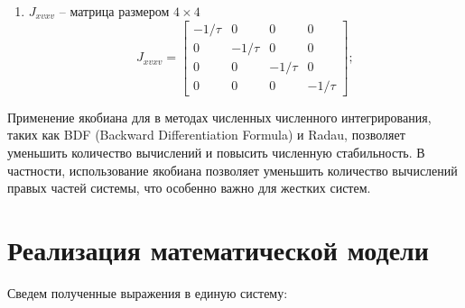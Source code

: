 \begin{enumerate}
    \item $J_{xvxv}$ -- матрица размером $4 \times 4$
          \begin{equation*}
              J_{xvxv} = \begin{bmatrix}
                  -1/\tau & 0       & 0       & 0       \\
                  0       & -1/\tau & 0       & 0       \\
                  0       & 0       & -1/\tau & 0       \\
                  0       & 0       & 0       & -1/\tau
              \end{bmatrix};
          \end{equation*}
\end{enumerate}

Применение якобиана для в методах численных численного интегрирования, таких как
BDF (Backward Differentiation Formula) и Radau, позволяет уменьшить количество вычислений
и повысить численную стабильность. В частности, использование якобиана позволяет
уменьшить количество вычислений правых частей системы, что особенно важно для жестких систем.

\section{Реализация математической модели}\label{sec:ch2/sec6}

Сведем полученные выражения в единую систему:

